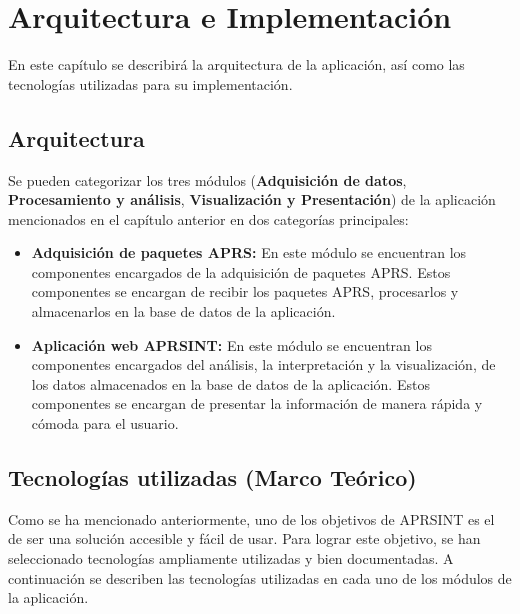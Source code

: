 \titlespacing*{\chapter}{0pt}{-1.25cm}{25pt}
\chapter{Arquitectura e Implementación}

En este capítulo se describirá la arquitectura de la aplicación, así como las tecnologías utilizadas para su implementación.

\section{Arquitectura}

Se pueden categorizar los tres módulos (\textbf{Adquisición de datos}, \textbf{Procesamiento y análisis}, \textbf{Visualización y Presentación}) de la aplicación mencionados en el capítulo anterior en dos categorías principales:

\begin{itemize}
	\item \textbf{Adquisición de paquetes APRS:} En este módulo se encuentran los componentes encargados de la adquisición de paquetes APRS. Estos componentes se encargan de recibir los paquetes APRS, procesarlos y almacenarlos en la base de datos de la aplicación.

	\item \textbf{Aplicación web APRSINT:} En este módulo se encuentran los componentes encargados del análisis, la interpretación y la visualización, de los datos almacenados en la base de datos de la aplicación. Estos componentes se encargan de presentar la información de manera rápida y cómoda para el usuario.
\end{itemize}

\section{Tecnologías utilizadas (Marco Teórico)}

Como se ha mencionado anteriormente, uno de los objetivos de APRSINT es el de ser una solución accesible y fácil de usar. Para lograr este objetivo, se han seleccionado tecnologías ampliamente utilizadas y bien documentadas. A continuación se describen las tecnologías utilizadas en cada uno de los módulos de la aplicación.
